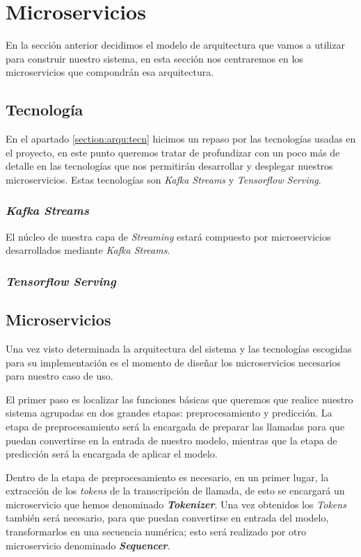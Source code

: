 \section{Microservicios}
En la sección anterior decidimos el modelo de arquitectura que vamos a utilizar para construir nuestro sistema, en esta sección nos centraremos en los microservicios que compondrán esa arquitectura.  

\subsection{Tecnología}
En el apartado \ref{section:arqu:tecn} hicimos un repaso por las tecnologías usadas en el proyecto, en este punto queremos tratar de profundizar con un poco más de detalle en las tecnologías que nos permitirán desarrollar y desplegar nuestros microservicios. Estas tecnologías son \textit{Kafka Streams} y \textit{Tensorflow Serving}.

\subsubsection{\textit{Kafka Streams}}

El núcleo de nuestra capa de \textit{Streaming} estará compuesto por microservicios desarrollados mediante 
 \textit{Kafka Streams}.
\subsubsection{\textit{Tensorflow Serving}}




\subsection{Microservicios}

Una vez visto determinada la arquitectura del sistema y las tecnologías escogidas para su implementación es el momento de diseñar los microservicios necesarios para nuestro caso de uso.

El primer paso es localizar las funciones básicas que queremos que realice nuestro sistema agrupadas en dos grandes etapas: preprocesamiento y predicción. La etapa de preprocesamiento será la encargada de preparar las llamadas para que puedan convertirse en la entrada de nuestro modelo, mientras que la etapa de predicción será la encargada de aplicar el modelo. 

Dentro de la etapa de preprocesamiento es necesario, en un primer lugar, la extracción de los \textit{tokens} de la transcripción de llamada, de esto se encargará un microservicio que hemos denominado \textit{\textbf{Tokenizer}}. Una vez obtenidos los \textit{Tokens} también será necesario, para que puedan convertirse en entrada del modelo, transformarlos en una secuencia numérica; esto será realizado por otro microservicio denominado \textit{\textbf{Sequencer}}.

